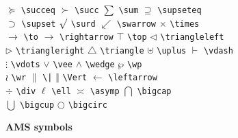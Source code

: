 \documentclass{asl}
\begin{document}
\begin{tabbing}
$\succeq$ \> \verb+\succeq+ \> $\succ$ \> \verb+\succ+ \>
$\sum$ \> \verb+\sum+ \> $\supseteq$ \> \verb+\supseteq+ \\
$\supset$ \> \verb+\supset+ \> $\surd$ \> \verb+\surd+ \>
$\swarrow$ \> \verb+\swarrow+ \> $\times$ \> \verb+\times+ \\
$\to$ \> \verb+\to+ \> $\rightarrow$ \> \verb+\rightarrow+ \>
$\top$ \> \verb+\top+ \> $\triangleleft$ \> \verb+\triangleleft+ \\
$\triangleright$ \> \verb+\triangleright+ \> $\triangle$ \> \verb+\triangle+ \>
$\uplus$ \> \verb+\uplus+ \> $\vdash$ \> \verb+\vdash+ \\
$\vdots$ \> \verb+\vdots+ \> $\vee$ \> \verb+\vee+ \>
$\wedge$ \> \verb+\wedge+ \> $\wp$ \> \verb+\wp+ \\
$\wr$ \> \verb+\wr+ \> $\|$ \> \verb+\|+ \>
$\Vert$ \> \verb+\Vert+ \> $\leftarrow$ \> \verb+\leftarrow+\\
$\div$ \> \verb+\div+ \> $\ell$ \> \verb+\ell+ \>
$\asymp$ \> \verb+\asymp+ \> $\bigcap$ \verb+\bigcap+\\
$\bigcup$ \> \verb+\bigcup+ \> $\bigcirc$ \> \verb+\bigcirc+ \\

\end{tabbing}
\medskip

\centerline{\bf AMS symbols}
\medskip
\end{document}
